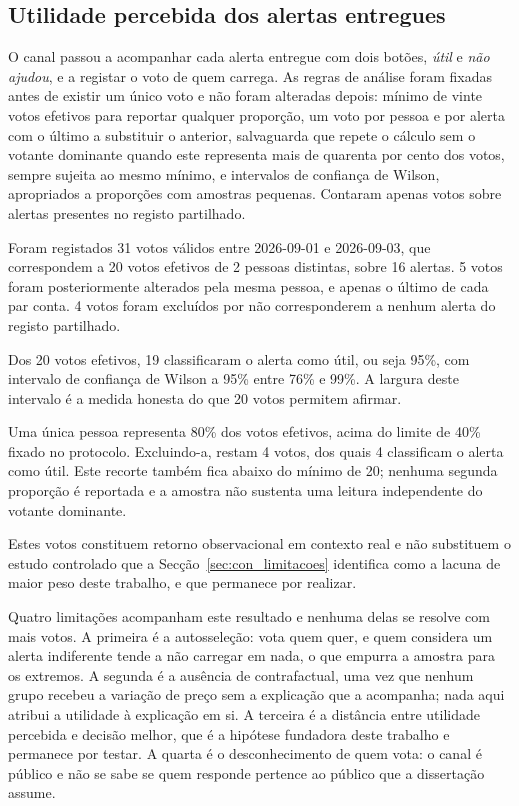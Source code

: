 \subsection{Utilidade percebida dos alertas entregues}
\label{sec:av_feedback}

O canal passou a acompanhar cada alerta entregue com dois botões, \emph{útil} e \emph{não ajudou}, e a registar o voto de quem carrega. As regras de análise foram fixadas antes de existir um único voto e não foram alteradas depois: mínimo de vinte votos efetivos para reportar qualquer proporção, um voto por pessoa e por alerta com o último a substituir o anterior, salvaguarda que repete o cálculo sem o votante dominante quando este representa mais de quarenta por cento dos votos, sempre sujeita ao mesmo mínimo, e intervalos de confiança de Wilson, apropriados a proporções com amostras pequenas.
Contaram apenas votos sobre alertas presentes no registo partilhado.

Foram registados 31 votos válidos entre 2026-09-01 e 2026-09-03, que correspondem a 20 votos efetivos de 2 pessoas distintas, sobre 16 alertas. 5 votos foram posteriormente alterados pela mesma pessoa, e apenas o último de cada par conta. 4 votos foram excluídos por não corresponderem a nenhum alerta do registo partilhado.

Dos 20 votos efetivos, 19 classificaram o alerta como útil, ou seja 95\%, com intervalo de confiança de Wilson a 95\% entre 76\% e 99\%. A largura deste intervalo é a medida honesta do que 20 votos permitem afirmar.

Uma única pessoa representa 80\% dos votos efetivos, acima do limite de 40\% fixado no protocolo. Excluindo-a, restam 4 votos, dos quais 4 classificam o alerta como útil.
Este recorte também fica abaixo do mínimo de 20; nenhuma segunda proporção é reportada e a amostra não sustenta uma leitura independente do votante dominante.

Estes votos constituem retorno observacional em contexto real e não substituem o estudo controlado que a Secção~\ref{sec:con_limitacoes} identifica como a lacuna de maior peso deste trabalho, e que permanece por realizar.

Quatro limitações acompanham este resultado e nenhuma delas se resolve com mais votos. A primeira é a autosseleção: vota quem quer, e quem considera um alerta indiferente tende a não carregar em nada, o que empurra a amostra para os extremos. A segunda é a ausência de contrafactual, uma vez que nenhum grupo recebeu a variação de preço sem a explicação que a acompanha; nada aqui atribui a utilidade à explicação em si. A terceira é a distância entre utilidade percebida e decisão melhor, que é a hipótese fundadora deste trabalho e permanece por testar. A quarta é o desconhecimento de quem vota: o canal é público e não se sabe se quem responde pertence ao público que a dissertação assume.
